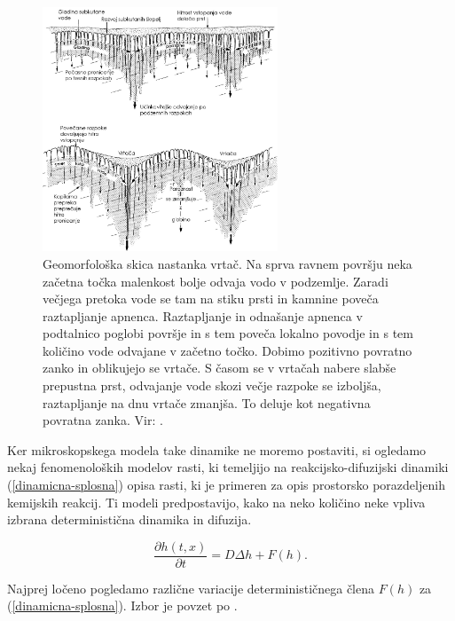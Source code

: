 \documentclass[a4paper, twoside, 12pt]{book}
\begin{document}
\begin{figure}[h!]
  \begin{center}
    \includegraphics[width=7cm]{slike/vrtaca-ford-williams.jpg}
  \end{center}
  \caption{Geomorfološka skica nastanka vrtač. Na sprva ravnem površju neka začetna točka malenkost bolje odvaja vodo v podzemlje. Zaradi večjega pretoka vode se tam na stiku prsti in kamnine poveča raztapljanje apnenca. Raztapljanje in odnašanje apnenca v podtalnico poglobi površje in s tem poveča lokalno povodje in s tem količino vode odvajane v začetno točko. Dobimo pozitivno povratno zanko in oblikujejo se vrtače. S časom se v vrtačah nabere slabše prepustna prst, odvajanje vode skozi večje razpoke se izboljša, raztapljanje na dnu vrtače zmanjša. To deluje kot negativna povratna zanka. Vir: \cite{ford2007karst}.}
\label{fig:vrtaca-ford-williams}
\end{figure}

Ker mikroskopskega modela take dinamike ne moremo postaviti, si ogledamo nekaj fenomenoloških modelov rasti, ki temeljijo na reakcijsko-difuzijski dinamiki (\ref{dinamicna-splosna}) opisa rasti, ki je primeren za opis prostorsko porazdeljenih kemijskih reakcij. Ti modeli predpostavijo, kako na neko količino neke vpliva izbrana deterministična dinamika in difuzija.

\begin{equation}
  \frac{ \partial h(t,x) }{ \partial t} = D \Delta h + F(h).
  \label{dinamicna-splosna}
\end{equation}

Najprej ločeno pogledamo različne variacije determinističnega člena $F(h)$ za (\ref{dinamicna-splosna}). Izbor je povzet po \cite{kandler2010population}.

\end{document}
